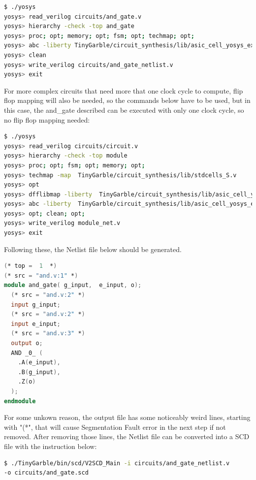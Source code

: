 \begin{refsection}
\begin{lstlisting}[caption={Yosys instructions to compile the HDL file to a Netlist file}, language=bash, captionpos=b]
$ ./yosys
yosys> read_verilog circuits/and_gate.v
yosys> hierarchy -check -top and_gate
yosys> proc; opt; memory; opt; fsm; opt; techmap; opt;
yosys> abc -liberty TinyGarble/circuit_synthesis/lib/asic_cell_yosys_extended.lib
yosys> clean
yosys> write_verilog circuits/and_gate_netlist.v
yosys> exit					
\end{lstlisting}

For more complex circuits that need more that one clock cycle to compute, flip flop mapping will also be needed, so the commands below have to be used, but in this case, the and\_gate described can be executed with only one clock cycle, so no flip flop mapping needed:
\begin{lstlisting}[caption={Yosys instructions to compile the Verilog fiile into a Netlist one with fliip flop mapping}, language=bash, captionpos=b]
$ ./yosys
yosys> read_verilog circuits/circuit.v
yosys> hierarchy -check -top module
yosys> proc; opt; fsm; opt; memory; opt;
yosys> techmap -map  TinyGarble/circuit_synthesis/lib/stdcells_S.v
yosys> opt
yosys> dfflibmap -liberty  TinyGarble/circuit_synthesis/lib/asic_cell_yosys_extended.lib
yosys> abc -liberty  TinyGarble/circuit_synthesis/lib/asic_cell_yosys_extended.lib -script  TinyGarble/circuit_synthesis/lib/script.abc
yosys> opt; clean; opt;
yosys> write_verilog module_net.v	
yosys> exit	
\end{lstlisting}

Following these, the Netlist file below should be generated.

\begin{lstlisting}[caption={and\_gate\_netlist.v}, language=Verilog, captionpos=b]
(* top =  1  *)
(* src = "and.v:1" *)
module and_gate( g_input,  e_input, o);
  (* src = "and.v:2" *)
  input g_input;
  (* src = "and.v:2" *)
  input e_input;
  (* src = "and.v:3" *)
  output o;
  AND _0_ (
    .A(e_input),
    .B(g_input),
    .Z(o)
  );
endmodule
\end{lstlisting}

For some unkown reason, the output file has some noticeably weird lines, starting with "(*", that will cause Segmentation Fault error in the next step if not removed.
After removing those lines, the Netlist file can be converted into a SCD file with the instruction below:

\begin{lstlisting}[caption={Installation of Yosys-abc}, language=bash, captionpos=b]
$ ./TinyGarble/bin/scd/V2SCD_Main -i circuits/and_gate_netlist.v
-o circuits/and_gate.scd		
\end{lstlisting}


\end{refsection}
